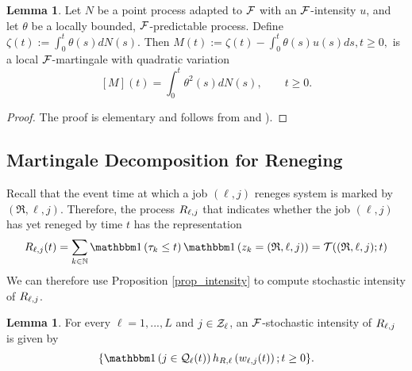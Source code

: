 \documentclass{article}
\theoremstyle{definition}
\newtheorem{lemma}[theorem]{Lemma}
\numberwithin{equation}{section}
\begin{document}
\begin{lemma}\label{remark_integral}
Let $N$ be a point process adapted to $\mathcal{F}$ with an $\mathcal{F}$-intensity $u$, and let $\theta$ be a locally bounded, $\mathcal{F}$-predictable process. Define $\zeta(t):=\int_0^t \theta(s)d N(s).$ Then  $M(t):=\zeta(t)-\int_0^t \theta(s) u(s)ds, t\geq 0,$ is a local $\mathcal{F}$-martingale with quadratic variation
\begin{equation}\label{remark_Quad}
  [M](t)=\int_0^t \theta^2(s)d N(s), \quad\quad t\geq0.
\end{equation}
\end{lemma}
\begin{proof}
The proof is elementary and follows from  \cite[Lemma II.L3]{BremaudBook} and \cite[(18.1), Chapter IV]{RogWilbook2}).
\end{proof}


\subsection{Martingale Decomposition for Reneging}
Recall that the event time at which a job $(\ell,j)$ reneges system is marked by $(\mathfrak{R},\ell,j)$. Therefore, the process $R_{\ell,j}$ that indicates whether the job $(\ell,j)$ has yet reneged by time $t$ has the representation
\begin{equation}\label{Rl_marked}
\reneg_{\ell,j}(t)=\sum_{k\in\N}\indic{\tau_k\leq t}\indic{z_k=(\mathfrak{R},\ell,j)}=\mathcal{T}((\mathfrak{R},\ell,j);t)
\end{equation}
We can therefore use Proposition \ref{prop_intensity} to compute stochastic intensity of  $R_{\ell,j}$.

\begin{lemma}\label{lem_Rintensity}
  For every $\ell=1,...,L$ and $j\in\mathcal{Z}_\ell$, an $\mathcal{F}$-stochastic intensity of $R_{\ell,j}$ is given by
  \begin{equation}\label{Rlj_decomposition}
   \{\indic{j\in\inque_\ell(t)} h_{R,\ell}\left(\waiting_{\ell,j}(t)\right);t\geq0\}.
  \end{equation}
\end{lemma}
\end{document}
